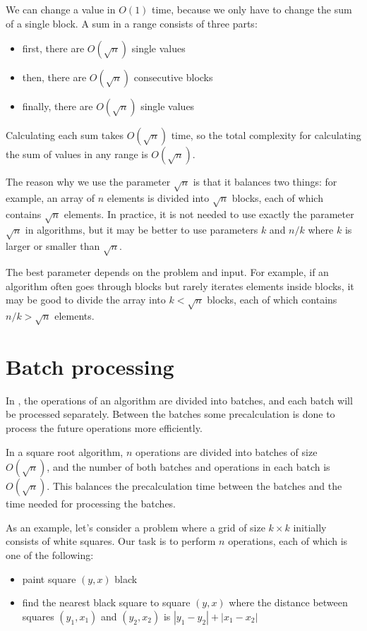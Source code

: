 We can change a value in $O(1)$ time,
because we only have to change the sum of a single block.
A sum in a range consists of three parts:

\begin{itemize}
\item first, there are $O(\sqrt n)$ single values
\item then, there are $O(\sqrt n)$ consecutive blocks
\item finally, there are $O(\sqrt n)$ single values
\end{itemize}

Calculating each sum takes $O(\sqrt n)$ time,
so the total complexity for calculating the sum
of values in any range is $O(\sqrt n)$.

The reason why we use the parameter $\sqrt n$ is that
it balances two things:
for example, an array of $n$ elements is divided
into $\sqrt n$ blocks, each of which contains
$\sqrt n$ elements.
In practice, it is not needed to use exactly
the parameter $\sqrt n$ in algorithms, but it may be better to
use parameters $k$ and $n/k$ where $k$ is
larger or smaller than $\sqrt n$.

The best parameter depends on the problem
and input.
For example, if an algorithm often goes through
blocks but rarely iterates elements inside
blocks, it may be good to divide the array into
$k < \sqrt n$ blocks, each of which contains $n/k > \sqrt n$
elements.

\section{Batch processing}


In , the operations of an
algorithm are divided into batches,
and each batch will be processed separately.
Between the batches some precalculation is done
to process the future operations more efficiently.

In a square root algorithm, $n$ operations are
divided into batches of size $O(\sqrt n)$,
and the number of both batches and operations in each
batch is $O(\sqrt n)$.
This balances the precalculation time between
the batches and the time needed for processing
the batches.

As an example, let's consider a problem
where a grid of size $k \times k$
initially consists of white squares.
Our task is to perform $n$ operations,
each of which is one of the following:
\begin{itemize}
\item
paint square $(y,x)$ black
\item
find the nearest black square to
square $(y,x)$ where the distance
between squares $(y_1,x_1)$ and $(y_2,x_2)$
is $|y_1-y_2|+|x_1-x_2|$
\end{itemize}

